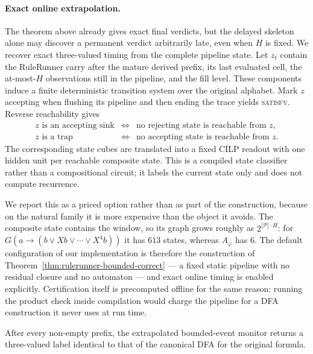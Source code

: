 \paragraph{Exact online extrapolation.}
The theorem above already gives exact final verdicts, but the delayed skeleton
alone may discover a permanent verdict arbitrarily late, even when $H$ is
fixed.  We recover exact
three-valued timing from the complete pipeline state.  Let $z_t$ contain the
RuleRunner carry after the mature derived prefix, its last evaluated cell, the
at-most-$H$ observations still in the pipeline, and the fill level.  These
components induce a finite deterministic transition system over the original
alphabet.  Mark $z$ accepting when flushing its pipeline and then ending the
trace yields \textsc{satisfy}.  Reverse reachability gives
\[
\begin{array}{rcl}
z\text{ is an accepting sink}
&\Longleftrightarrow&
\text{no rejecting state is reachable from }z,\\
z\text{ is a trap}
&\Longleftrightarrow&
\text{no accepting state is reachable from }z.
\end{array}
\]
The corresponding state cubes are translated into a fixed CILP readout with one
hidden unit per reachable composite state.  This is a compiled state classifier
rather than a compositional circuit; it labels the current state only and does
not compute recurrence.

We report this as a priced option rather than as part of the construction,
because on the natural family it is more expensive than the object it avoids.
The composite state contains the window, so its graph grows roughly as
$2^{|\mathcal P|\cdot H}$: for $G(a\to(b\lor Xb\lor\cdots\lor X^4b))$ it has
$613$ states, whereas $A_\varphi$ has $6$.  The default configuration of our
implementation is therefore the construction of
Theorem~\ref{thm:rulerunner-bounded-correct} --- a fixed static pipeline with no
residual closure and no automaton --- and exact online timing is enabled
explicitly.  Certification itself is precomputed offline for the same reason:
running the product check inside compilation would charge the pipeline for a DFA
construction it never uses at run time.

\begin{corollary}
\label{cor:rulerunner-bounded-online}
After every non-empty prefix, the extrapolated bounded-event monitor returns a
three-valued label identical to that of the canonical DFA for the original
formula.
\end{corollary}

